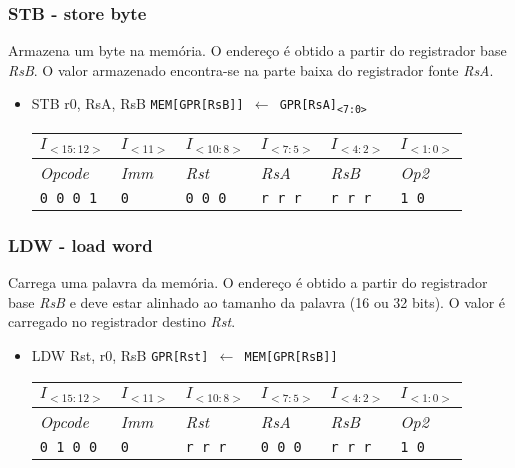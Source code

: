 \documentclass{extreport}
\begin{document}
\subsubsection{STB - store byte}
Armazena um byte na memória. O endereço é obtido a partir do registrador base \textit{RsB}. O valor armazenado encontra-se na parte baixa do registrador fonte \textit{RsA}.

\begin{itemize}
\item STB r0, RsA, RsB
\subitem \texttt{MEM[GPR[RsB]] $\leftarrow$ GPR[RsA]\textsubscript{<7:0>}}
\begin{table}[ht!]
\centering
\begin{tabular}{|p{1.6cm}|p{1.6cm}|p{1.6cm}|p{1.6cm}|p{1.6cm}|p{1.6cm}|}
\hline
$I_{<15:12>}$ & $I_{<11>}$ & $I_{<10:8>}$ & $I_{<7:5>}$ & $I_{<4:2>}$ & $I_{<1:0>}$ \\ \hline
\textit{Opcode} & \textit{Imm} & \textit{Rst} & \textit{RsA} & \textit{RsB} & \textit{Op2} \\ \hline
\texttt{0 0 0 1} & \texttt{0} & \texttt{0 0 0} & \texttt{r r r} & \texttt{r r r} & \texttt{1 0} \\ \hline
\end{tabular}
\end{table}
\end{itemize}

\subsubsection{LDW - load word}
Carrega uma palavra da memória. O endereço é obtido a partir do registrador base \textit{RsB} e deve estar alinhado ao tamanho da palavra (16 ou 32 bits). O valor é carregado no registrador destino \textit{Rst}.

\begin{itemize}
\item LDW Rst, r0, RsB
\subitem \texttt{GPR[Rst] $\leftarrow$ MEM[GPR[RsB]]}
\begin{table}[ht!]
\centering
\begin{tabular}{|p{1.6cm}|p{1.6cm}|p{1.6cm}|p{1.6cm}|p{1.6cm}|p{1.6cm}|}
\hline
$I_{<15:12>}$ & $I_{<11>}$ & $I_{<10:8>}$ & $I_{<7:5>}$ & $I_{<4:2>}$ & $I_{<1:0>}$ \\ \hline
\textit{Opcode} & \textit{Imm} & \textit{Rst} & \textit{RsA} & \textit{RsB} & \textit{Op2} \\ \hline
\texttt{0 1 0 0} & \texttt{0} & \texttt{r r r} & \texttt{0 0 0} & \texttt{r r r} & \texttt{1 0} \\ \hline
\end{tabular}
\end{table}
\end{itemize}
\end{document}
